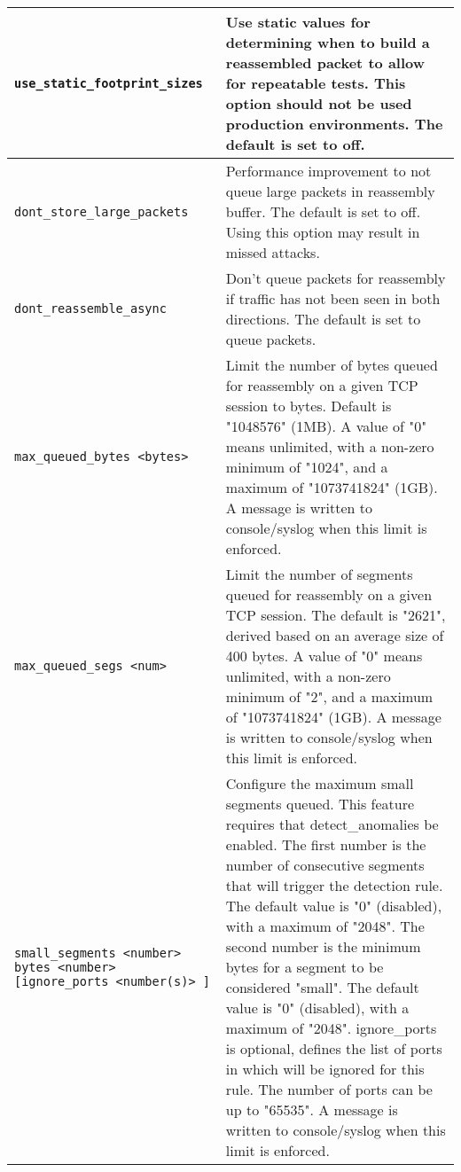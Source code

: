 \documentclass[english]{report}
\begin{document}
\begin{longtable}[h]{| p{2in} | p{4in} |}
\hline
\texttt{use\_static\_footprint\_sizes} &

Use static values for determining when to build a reassembled packet to
allow for repeatable tests.  This option should not be used production
environments.  The default is set to off.\\

\hline
\texttt{dont\_store\_large\_packets} &

Performance improvement to not queue large packets in reassembly buffer.  The
default is set to off.  Using this option may result in missed attacks.\\

\hline
\texttt{dont\_reassemble\_async} &

Don't queue packets for reassembly if traffic has not been seen in both
directions.  The default is set to queue packets.\\

\hline
\texttt{max\_queued\_bytes <bytes>} &

Limit the number of bytes queued for reassembly on a given TCP session to
bytes.  Default is "1048576" (1MB).  A value of "0" means unlimited, with a
non-zero minimum of "1024", and a maximum of "1073741824" (1GB).  A message is
written to console/syslog when this limit is enforced.\\

\hline
\texttt{max\_queued\_segs <num>} &

Limit the number of segments queued for reassembly on a given TCP session.  The
default is "2621", derived based on an average size of 400 bytes.  A value of
"0" means unlimited, with a non-zero minimum of "2", and a maximum of
"1073741824" (1GB).  A message is written to console/syslog when this limit is
enforced.\\

\hline
\texttt{small\_segments <number> bytes <number> [ignore\_ports <number(s)> ]} &

Configure the maximum small segments queued. This feature requires that 
detect\_anomalies be enabled. The first number is the number of consecutive segments 
that will trigger the detection rule. The default value is "0" (disabled), with a 
maximum of "2048". The second number is the minimum bytes for a segment to be 
considered "small". The default value is "0" (disabled), with a maximum of "2048".  
ignore\_ports is optional, defines the list of ports in which will be ignored for 
this rule. The number of ports can be up to "65535".  A message is written to 
console/syslog when this limit is enforced.\\


\end{longtable}
\end{document}
